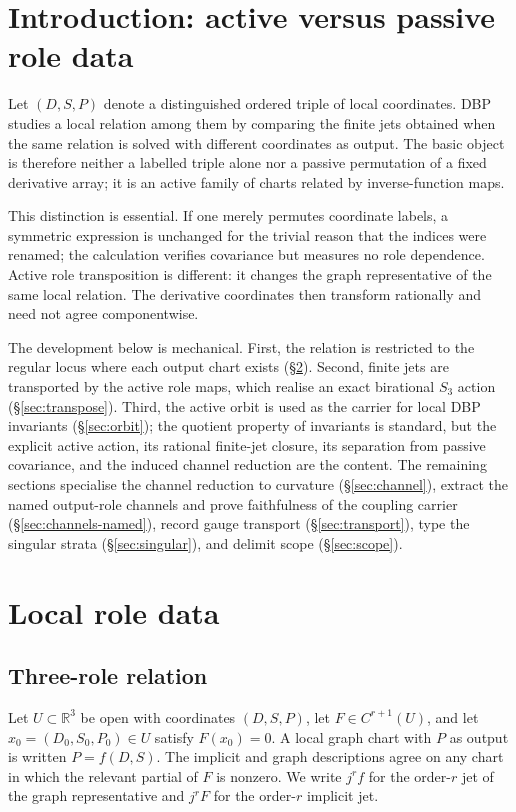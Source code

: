 \documentclass[11pt]{article}
\theoremstyle{plain}
\theoremstyle{definition}
\newcommand{\jet}{j}
\begin{document}
\section{Introduction: active versus passive role data}
\label{sec:intro}

Let $(D,S,P)$ denote a distinguished ordered triple of local coordinates. DBP studies a local
relation among them by comparing the finite jets obtained when the same relation is solved with
different coordinates as output. The basic object is therefore neither a labelled triple alone nor a
passive permutation of a fixed derivative array; it is an active family of charts related by
inverse-function maps.

This distinction is essential. If one merely permutes coordinate labels, a symmetric expression is
unchanged for the trivial reason that the indices were renamed; the calculation verifies covariance
but measures no role dependence. Active role transposition is different: it changes the graph
representative of the same local relation. The derivative coordinates then transform rationally and
need not agree componentwise.

The development below is mechanical. First, the relation is restricted to the regular locus where
each output chart exists (\S\ref{sec:roledata}). Second, finite jets are transported by the active
role maps, which realise an exact birational $S_3$ action (\S\ref{sec:transpose}). Third, the active
orbit is used as the carrier for local DBP invariants (\S\ref{sec:orbit}); the quotient property of
invariants is standard, but the explicit active action, its rational finite-jet closure, its
separation from passive covariance, and the induced channel reduction are the content. The remaining
sections specialise the channel reduction to curvature (\S\ref{sec:channel}), extract the named
output-role channels and prove faithfulness of the coupling carrier (\S\ref{sec:channels-named}),
record gauge transport (\S\ref{sec:transport}), type the singular strata (\S\ref{sec:singular}), and
delimit scope (\S\ref{sec:scope}).

\section{Local role data}
\label{sec:roledata}

\subsection{Three-role relation}
Let $U\subset\mathbb R^3$ be open with coordinates $(D,S,P)$, let $F\in C^{r+1}(U)$, and let
$x_0=(D_0,S_0,P_0)\in U$ satisfy $F(x_0)=0$. A local graph chart with $P$ as output is written
$P=f(D,S)$. The implicit and graph descriptions agree on any chart in which the relevant partial of
$F$ is nonzero. We write $\jet^r f$ for the order-$r$ jet of the graph representative and $\jet^rF$
for the order-$r$ implicit jet.
\end{document}

